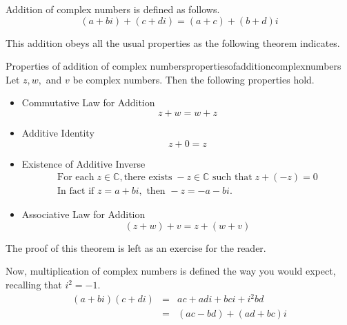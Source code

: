 Addition of complex numbers is defined as follows.
\begin{equation*}
\left( a+bi\right) +\left( c+di\right) =\left( a+c\right) +\left( b+d\right)i
\end{equation*}

This addition obeys all the usual properties as the following theorem indicates.

\begin{theorem}{Properties of addition of complex numbers}{propertiesofadditioncomplexnumbers}
Let $z,w,$ and $v$ be complex numbers. Then the following properties hold.
\begin{itemize}
\item Commutative Law for Addition
\begin{equation*}
z+w=w+z
\end{equation*}

\item Additive Identity
\begin{equation*}
z+0=z
\end{equation*}

\item Existence of Additive Inverse
\begin{equation*}
\begin{array}{l}
\mbox{For each} \; z\in \mathbb{C}, \mbox{there exists}\; -z\in \mathbb{C} \mbox{ such that}\; 
z+\left( -z\right) =0 \\
\mbox{In fact if } z=a+bi, \mbox{ then } -z=-a-bi.
\end{array}
\end{equation*}

\item Associative Law for Addition
\begin{equation*}
\left( z+w\right) +v= z +\left( w+v\right)
\end{equation*}
\end{itemize}
\end{theorem}

The proof of this theorem is left as an exercise for the reader.

Now, multiplication of complex numbers is defined the way you would expect, recalling that $i^{2} = -1$.
\begin{eqnarray*}
\left( a+bi\right) \left( c+di\right) &=&ac+adi+bci+i^{2}bd \\
&=&\left( ac-bd\right) +\left( ad + bc \right)i 
\end{eqnarray*}


